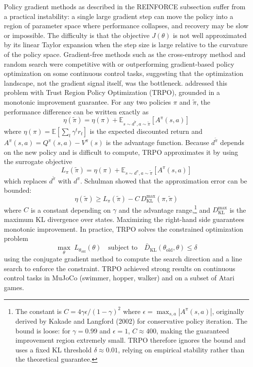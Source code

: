 Policy gradient methods as described in the REINFORCE subsection suffer from a practical instability: a single large gradient step can move the policy into a region of parameter space where performance collapses, and recovery may be slow or impossible. The difficulty is that the objective $J(\theta)$ is not well approximated by its linear Taylor expansion when the step size is large relative to the curvature of the policy space. Gradient-free methods such as the cross-entropy method and random search were competitive with or outperforming gradient-based policy optimization on some continuous control tasks, suggesting that the optimization landscape, not the gradient signal itself, was the bottleneck. \citet{Schulman2015} addressed this problem with Trust Region Policy Optimization (TRPO), grounded in a monotonic improvement guarantee. For any two policies $\pi$ and $\tilde{\pi}$, the performance difference can be written exactly as
\begin{equation}
\eta(\tilde{\pi}) = \eta(\pi) + \mathbb{E}_{s \sim d^{\tilde{\pi}}, a \sim \tilde{\pi}} \left[ A^\pi(s,a) \right]
\end{equation}
where $\eta(\pi) = \mathbb{E}[\sum_t \gamma^t r_t]$ is the expected discounted return and $A^\pi(s,a) = Q^\pi(s,a) - V^\pi(s)$ is the advantage function. Because $d^{\tilde{\pi}}$ depends on the new policy and is difficult to compute, TRPO approximates it by using the surrogate objective
\begin{equation}
L_\pi(\tilde{\pi}) = \eta(\pi) + \mathbb{E}_{s \sim d^\pi, a \sim \tilde{\pi}} \left[ A^\pi(s,a) \right]
\end{equation}
which replaces $d^{\tilde{\pi}}$ with $d^\pi$. Schulman showed that the approximation error can be bounded:
\begin{equation}
\eta(\tilde{\pi}) \geq L_\pi(\tilde{\pi}) - C \, D_{\mathrm{KL}}^{\max}(\pi, \tilde{\pi})
\end{equation}
where $C$ is a constant depending on $\gamma$ and the advantage range,\footnote{The constant is $C = 4\gamma\epsilon / (1-\gamma)^2$ where $\epsilon = \max_{s,a} |A^\pi(s,a)|$, originally derived by Kakade and Langford (2002) for conservative policy iteration. The bound is loose: for $\gamma = 0.99$ and $\epsilon = 1$, $C \approx 400$, making the guaranteed improvement region extremely small. TRPO therefore ignores the bound and uses a fixed KL threshold $\delta \approx 0.01$, relying on empirical stability rather than the theoretical guarantee.} and $D_{\mathrm{KL}}^{\max}$ is the maximum KL divergence over states. Maximizing the right-hand side guarantees monotonic improvement. In practice, TRPO solves the constrained optimization problem
\begin{equation}
\max_\theta \; L_{\theta_{\text{old}}}(\theta) \quad \text{subject to} \quad \bar{D}_{\mathrm{KL}}(\theta_{\text{old}}, \theta) \leq \delta
\end{equation}
using the conjugate gradient method to compute the search direction and a line search to enforce the constraint. TRPO achieved strong results on continuous control tasks in MuJoCo (swimmer, hopper, walker) and on a subset of Atari games.


